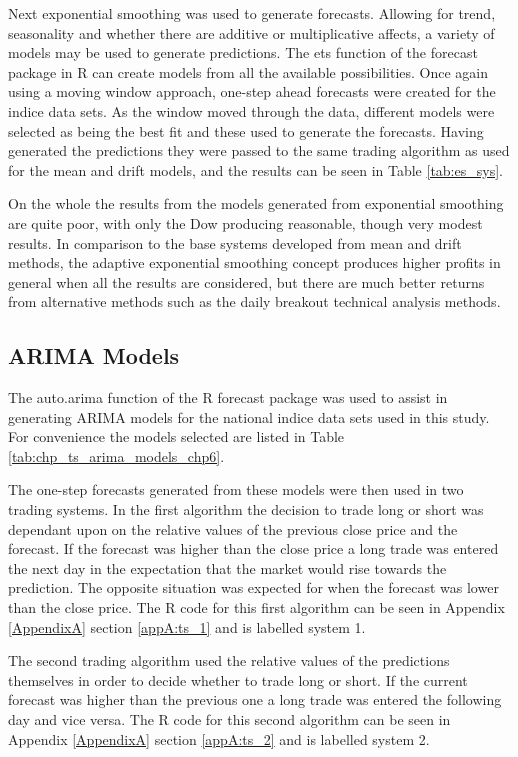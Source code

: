 Next exponential smoothing was used to  generate forecasts. Allowing for trend, seasonality and whether there are additive or multiplicative affects, a variety of models may be used to generate predictions. The ets function of the forecast package in R can create models from all the available possibilities. Once again using a moving window approach, one-step ahead forecasts were created for the indice data sets. As the window moved through the data, different models were selected as being the best fit and these used to generate the forecasts. Having generated the predictions they were passed to the same trading algorithm as used for the mean and drift models, and the results can be seen in Table \ref{tab:es_sys}. 

On the whole the results from the models generated from exponential smoothing are quite poor, with only the Dow producing reasonable, though very modest results. In comparison to the base systems developed from mean and drift methods, the adaptive exponential smoothing concept produces higher profits in general when all the results are considered, but there are much better returns from alternative methods such as the daily breakout technical analysis methods.

\subsection{ARIMA Models}
The auto.arima function of the R forecast package was used to assist in generating ARIMA models for the national indice data sets used in this study. For convenience the models selected are listed in Table \ref{tab:chp_ts_arima_models_chp6}.



The one-step forecasts generated from these models were then used in two trading systems. In the first algorithm the decision to trade long or short was dependant upon on the relative values of the previous close price and the forecast. If the forecast was higher than the close price a long trade was entered the next day in the expectation that the market would rise towards the prediction. The opposite situation was expected for when the forecast was lower than the close price. The R code for this first algorithm can be seen in Appendix \ref{AppendixA} section \ref{appA:ts_1} and is labelled system 1.

The second trading algorithm used the relative values of the predictions themselves in order to decide whether to trade long or short. If the current forecast was higher than the previous one a long trade was entered the following day and vice versa.  The R code for this second algorithm can be seen in Appendix \ref{AppendixA} section \ref{appA:ts_2} and is labelled system 2.


